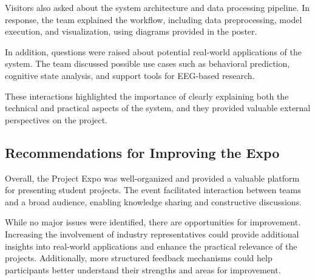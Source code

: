Visitors also asked about the system architecture and data processing pipeline. In response, the team explained the workflow, including data preprocessing, model execution, and visualization, using diagrams provided in the poster.

In addition, questions were raised about potential real-world applications of the system. The team discussed possible use cases such as behavioral prediction, cognitive state analysis, and support tools for EEG-based research.

These interactions highlighted the importance of clearly explaining both the technical and practical aspects of the system, and they provided valuable external perspectives on the project.

\subsection{Recommendations for Improving the Expo}
\label{subsec:expo-recommendations}

Overall, the Project Expo was well-organized and provided a valuable platform for presenting student projects. The event facilitated interaction between teams and a broad audience, enabling knowledge sharing and constructive discussions.

While no major issues were identified, there are opportunities for improvement. Increasing the involvement of industry representatives could provide additional insights into real-world applications and enhance the practical relevance of the projects. Additionally, more structured feedback mechanisms could help participants better understand their strengths and areas for improvement.